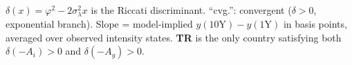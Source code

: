 \begin{table}[H]
\begin{tabular}{llrrrcccrrrr}
\bottomrule
\end{tabular}
\begin{tablenotes}[flushleft]\footnotesize
\item $\delta(x) = \varphi^2 - 2\sigma_\lambda^2 x$ is the Riccati discriminant. ``cvg.'': convergent ($\delta > 0$, exponential branch). Slope = model-implied $y(10\mathrm{Y}) - y(1\mathrm{Y})$ in basis points, averaged over observed intensity states. \textbf{TR} is the only country satisfying both $\delta(-A_i) > 0$ and $\delta(-A_g) > 0$.
\end{tablenotes}
\end{table}
